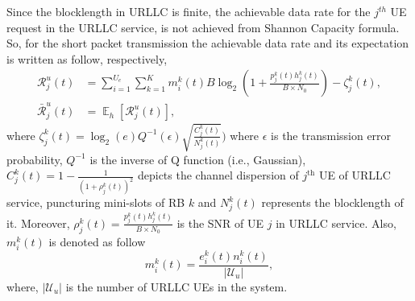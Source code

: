 \documentclass[conference]{IEEEtran}
\DeclareMathOperator{\E}{\mathbb{E}}
\begin{document}
Since the blocklength in URLLC is finite, the achievable data rate for the $j^{th}$ UE request in the URLLC service, is not achieved from Shannon Capacity formula. So, for the short packet transmission the achievable data rate and its expectation is written as follow, respectively, 
\begin{equation}\label{eq11}
\begin{split}
\mathcal{R}_{j}^u(t) &= \sum_{i = 1}^{U_e}\sum_{k=1}^K m_i^{k}(t) B \log_2({1+\frac{p^k_j(t)h^k_j(t)}{B \times N_0}})- \zeta_{j}^k(t),\\
\bar{\mathcal{R}}_{j}^u(t) &= \E_{h}[\mathcal{R}_{j}^u(t)],
\end{split} 
\end{equation}
where $\zeta_{j}^k(t) = \log_2({e})Q^{-1}(\epsilon) \sqrt{\frac{C_{j}^k(t)}{N_{j}^k(t)}})$
where $\epsilon$ is the transmission error probability, $Q^{-1}$ is the inverse of Q function (i.e., Gaussian),
$C_{j}^k(t) = 1 - \frac{1}{(1+\rho_{j}^k(t))^2}$ depicts the channel dispersion of $j^\text{th}$ UE of URLLC service, puncturing mini-slots of RB $k$ and
$N_{j}^k(t)$ represents the blocklength of it. Moreover, $\rho_{j}^k(t)=\frac{p^k_j(t)h^k_j(t)}{B \times N_0}$ is the SNR of UE $j$ in URLLC service. 
Also, $m_i^{k}(t) $ is denoted as follow
\begin{equation}
m_i^{k}(t)= \frac{e_i^k(t)n^k_i(t)}{|\mathcal{U}_u|},
\end{equation}
where, $|\mathcal{U}_u|$ is the number of URLLC UEs in the system.
\end{document}
